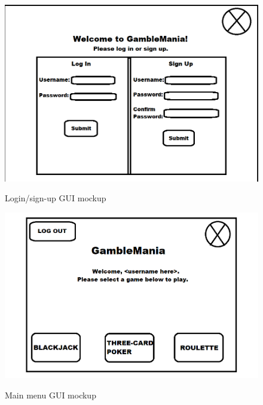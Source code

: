 \documentclass[10pt,conference,onecolumn,compsoc]{IEEEtran}
\begin{document}
\begin{figure}[h]
\caption{Login/sign-up GUI mockup}
\includegraphics[scale=0.4]{login}
\label{fig:login}
\centering
\end{figure}

\begin{figure}[h]
\caption{Main menu GUI mockup}
\includegraphics[scale=0.4]{main}
\label{fig:main}
\centering
\end{figure}

\newpage
\end{document}

